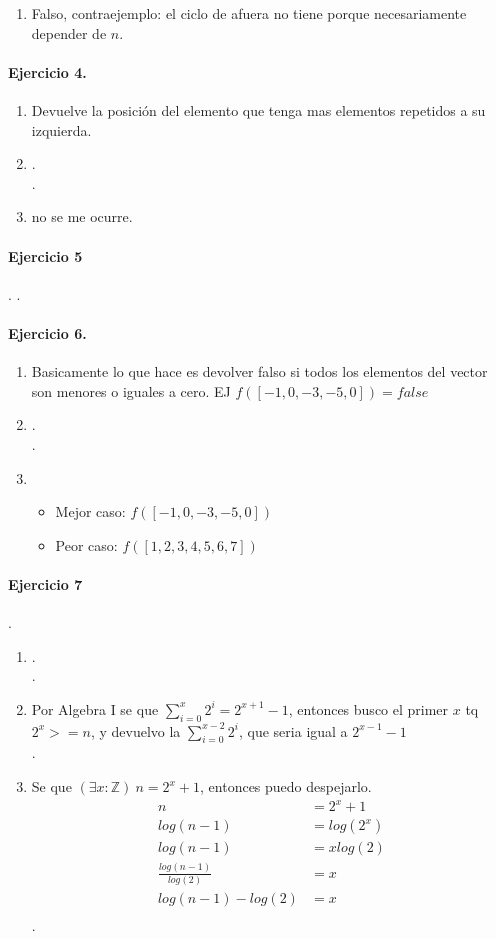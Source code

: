 \documentclass{article}
\begin{document}
\begin{enumerate}[label=\alph*)]
\item Falso, contraejemplo: el ciclo de afuera no tiene porque necesariamente depender de $n$.
\end{enumerate}
\paragraph{Ejercicio 4.}
\begin{enumerate}[label=\alph*)]
\item Devuelve la posición del elemento que tenga mas elementos repetidos a su izquierda.
\item .\\ .
\item no se me ocurre.
\end{enumerate}
\paragraph{Ejercicio 5}.
.
\paragraph{Ejercicio 6.}
\begin{enumerate}[label=\alph*)]
\item Basicamente lo que hace es devolver falso si todos los elementos del vector
	son menores o iguales a cero. EJ $f([-1,0,-3,-5,0])=false$
\item .\\ .
\item \begin{itemize}
			\item Mejor caso: $f([-1,0,-3,-5,0])$
			\item Peor caso: $f([1,2,3,4,5,6,7])$
		\end{itemize}	
\end{enumerate}
\paragraph{Ejercicio 7}.
\begin{enumerate}[label=\alph*)]
\item .\\.
\item Por Algebra I se que $\sum_{i=0}^{x}2^i=2^{x+1}-1$, entonces busco el primer $x$ tq $2^x>=n$, y devuelvo la 
 $\sum_{i=0}^{x-2}2^i$, que seria igual a $2^{x-1}-1$ \\.
\item Se que $(\exists x:\mathbb{Z})\ n=2^x+1$, entonces puedo despejarlo.
\begin{align*}
n &= 2^x+1 \\
log(n-1) &= log(2^x) \\ 
log(n-1) &= xlog(2) \\
\frac{log(n-1)}{log(2)} &= x \\
log(n-1)-log(2) &= x \\
\end{align*} .
\end{enumerate}
\end{document}
